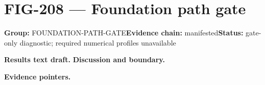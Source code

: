 \clearpage
\section{FIG-208 --- Foundation path gate}
\label{figpage:fig-208}
\textbf{Group:} FOUNDATION-PATH-GATE\quad \textbf{Evidence chain:} manifested\quad \textbf{Status:} gate-only diagnostic; required numerical profiles unavailable

\textbf{Results text draft.} 
\textbf{Discussion and boundary.} 


\textbf{Evidence pointers.}



\vfill
